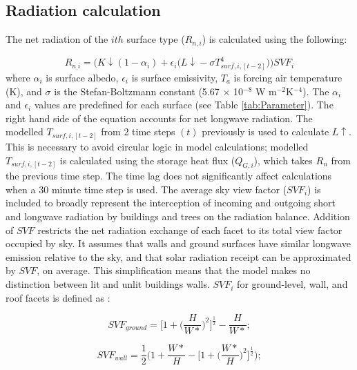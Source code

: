 \documentclass[journal abbreviation, manuscript]{copernicus}
\begin{document}
\subsection{Radiation calculation}\label{sec:net}

The net radiation of the $ith$ surface type ($R_{n,i}$) is calculated using the following:

\begin{equation} 
R_{n_,i}  = \bigg(\ensuremath{K\downarrow} (1-\ensuremath{\alpha}_{i}) + \ensuremath{\epsilon}_{i} \big(\ensuremath{L\downarrow} - \ensuremath{\sigma} T_{surf,i,[t-2]}^{4}\big) \bigg)\ensuremath{SVF}_{i}
\label{eq:rn2} \end{equation} where \ensuremath{\alpha}$_{i}$ is surface albedo, \ensuremath{\epsilon}$_{i}$ is surface emissivity, \ensuremath{T_{a}} is forcing air temperature (K), and \ensuremath{\sigma} is the Stefan-Boltzmann constant (5.67 $\times$ 10$^{-8}$ W m$^{-2}$K$^{-4}$). The \ensuremath{\alpha}$_{i}$ and \ensuremath{\epsilon}$_{i}$ values are predefined for each surface (see Table \ref{tab:Parameter}).  The right hand side of the equation accounts for net longwave radiation. The modelled $T_{surf,i,[t-2]}$ from 2 time steps $(t)$ previously is used to calculate \ensuremath{L\uparrow}. This is necessary to avoid circular logic in model calculations; modelled $T_{surf,i,[t-2]}$ is calculated using  the storage heat flux (\ensuremath{Q_{G,i}}), which takes \ensuremath{R_{n}} from the previous time step.  The time lag does not significantly affect calculations when a 30 minute time step is used. The average sky view factor ($\ensuremath{SVF}_{i}$) is included to broadly represent the  interception of incoming and outgoing short and longwave radiation by buildings and trees on the radiation balance. Addition of \ensuremath{SVF} restricts the net radiation exchange of each facet to its total view factor occupied by sky. It assumes that walls and ground surfaces have similar longwave emission relative to the sky, and that solar radiation receipt can be approximated by \ensuremath{SVF}, on average. This simplification means that the model makes no distinction  between lit and unlit buildings walls.   $\ensuremath{SVF}_{i}$ for ground-level, wall, and roof facets is defined as \citep{Sparrow1978}:

\begin{equation}
SVF_{ground} = \Bigg[1+\bigg(\frac{H}{W*}\bigg)^2\Bigg]^\frac{1}{2} - \frac{H}{W*} ;
\end{equation} 

\begin{equation}
SVF_{wall} = \frac{1}{2} \Bigg( 1 + \frac{W*}{H} - \bigg[ 1 + \bigg(\frac{W*}{H}\bigg)^2\bigg]^\frac{1}{2} \Bigg) ;
\end{equation}
\end{document}
